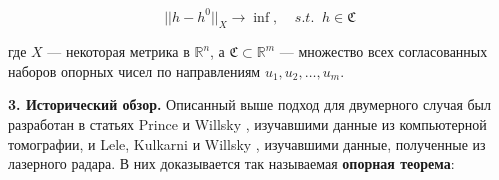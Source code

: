\documentclass[a4paper, 10pt]{article}
\theoremstyle{definition}
\theoremstyle{plain}
\theoremstyle{plain}
\begin{document}
\begin{equation}
 \label{equation:abstract-problem}
 ||h - h^{0} ||_{X} \to \inf, \;\;\;\; s. t. \;\; h \in \mathfrak{C}
\end{equation}

где $X$ --- некоторая метрика в $\mathbb{R}^{n}$, а
$\mathfrak{C} \subset \mathbb{R}^{m}$ --- множество всех согласованных наборов
опорных чисел по направлениям $u_{1}, u_{2}, \ldots, u_{m}$.

\textbf{3. Исторический обзор.} Описанный выше подход для двумерного случая был
разработан в статьях Prince и Willsky \cite{PrinceWillsky},
изучавшими данные из компьютерной томографии,  и Lele, Kulkarni и Willsky
\cite{LeleKulkarniWillsky}, изучавшими данные, полученные из лазерного радара. В них
доказывается так называемая \textbf{опорная теорема}:
\end{document}
